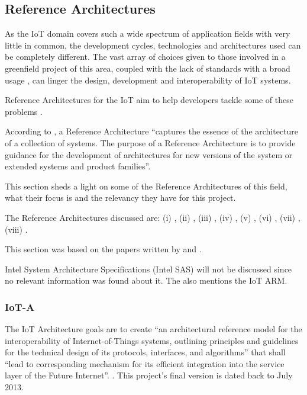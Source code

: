 \subsection{Reference Architectures}
\label{subsec:stateofart:arch:ref}

As the \gls{IoT} domain covers such a wide spectrum of application fields with very little in common, the development cycles, technologies and architectures used can be completely different. The vast array of choices given to those involved in a greenfield project of this area, coupled with the lack of standards with a broad usage \parencite{DIAS2022100529, weyrich2015reference}, can linger the design, development and interoperability of \gls{IoT} systems.

Reference Architectures for the \gls{IoT} aim to help developers tackle some of these problems \parencite{weyrich2015reference}.

According to \cite{muller2008reference}, a Reference Architecture ``captures the essence of the architecture of a collection of systems. The purpose of a Reference Architecture is to provide guidance for the development of architectures for new versions of the system or extended systems and product families''.

This section sheds a light on some of the Reference Architectures of this field, what their focus is and the relevancy they have for this project.

The Reference Architectures discussed are: (i) , (ii) , (iii) , (iv) , (v) , (vi) , (vii) , (viii) .

This section was based on the papers written by \cite{Lynn2020} and \cite{DIAS2022100529}.

Intel System Architecture Specifications (Intel SAS) will not be discussed since no relevant information was found about it.
The  also mentions the \gls{IoT} \gls{ARM}.

\subsubsection{IoT-A}
\label{subsubsec:stateofart:arch:iota}

The IoT Architecture goals are to create ``an architectural reference model for the interoperability of Internet-of-Things systems, outlining principles and guidelines for the technical design of its protocols, interfaces, and algorithms'' that shall ``lead to corresponding mechanism for its efficient integration into the service layer of the Future Internet''. \parencite{iot-a}. This project's final version is dated back to July 2013.

